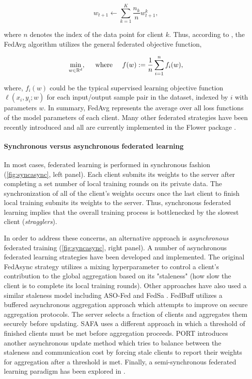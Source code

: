\documentclass[twocolumn, switch]{article} %
\begin{document}
\begin{equation}
    w_{t+1} \leftarrow \sum_{k=1}^K \frac{n_k}{n} w^k_{t+1}, 
\end{equation}

where $n$ denotes the index of the data point for client $k$. Thus, according to \cite{fed_2}, the FedAvg algorithm utilizes the general federated objective function,

\begin{equation}
    \min_{w \in \mathbb{R}^d},  \hspace{5mm} \text{where} \hspace{5mm} f(w) := \frac{1}{n} \sum_{i=1}^n f_i(w),
\end{equation}

where, $f_i(w)$ could be the typical supervised learning objective function $\ell(x_i, y_i; w)$ for each input/output sample pair in the dataset, indexed by $i$ with parameters $w$. In summary, FedAvg represents the average over all loss functions of the model parameters of each client. Many other federated strategies have been recently introduced and all are currently implemented in the Flower package \cite{flower}.

\paragraph{Synchronous versus asynchronous federated learning}

In most cases, federated learning is performed in synchronous fashion (\autoref{fig:syncasync}, left panel). Each client submits its weights to the server after completing a set number of local training rounds on its private data. The synchronization of all of the client's weights occurs once the last client to finish local training submits its weights to the server. Thus, synchronous federated learning implies that the overall training process is bottlenecked by the slowest client (\textit{stragglers}).

In order to address these concerns, an alternative approach is \textit{asynchronous} federated training (\autoref{fig:syncasync}, right panel).  A number of asynchronous federated learning strategies have been developed and implemented. The original FedAsync \cite{fedasync} strategy utilizes a mixing hyperparameter to control a client's contribution to the global aggregation based on its "staleness" (how slow the client is to complete its local training rounds). Other approaches have also used a similar staleness model including ASO-Fed \cite{asofed} and FedSa \cite{fedsa}. FedBuff \cite{fedbuff, fedbuff2} utilizes a buffered asynchronous aggregation approach which attempts to improve on secure aggregation protocols. The server selects a fraction of clients and aggregates them securely before updating. SAFA \cite{safa} uses a different approach in which a threshold of finished clients must be met before aggregation proceeds. PORT \citep{fed_async1} introduces another asynchronous update method which tries to balance between the staleness and communication cost by forcing stale clients to report their weights for aggregation after a threshold is met. Finally, a semi-synchronous federated learning paradigm has been explored in \cite{semi}.
\end{document}
